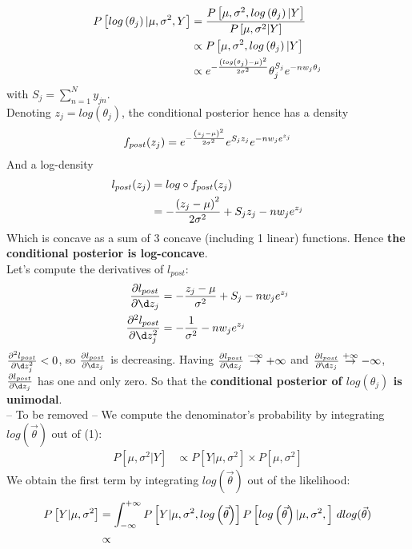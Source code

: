 \documentclass[twoside]{article}
\begin{document}
\begin{align*}
P\left[log\left(\theta_j\right) | \mu, \sigma^2, Y\right] & =  \frac{P\left[\mu, \sigma^2, log\left(\theta_j\right) | Y\right]}{P\left[\mu, \sigma^2 | Y\right]}\\
& \propto P\left[\mu, \sigma^2, log\left(\theta_j\right) | Y\right]\\
& \propto  \* e^{- \frac{\left(log\left(\theta_j\right) - \mu\right)^2}{2 \* \sigma^2}} \* \theta_j^{S_j} \* e^{- n \* w_j \* \theta_j}
\end{align*}
with $S_j = \sum_{n=1}^N y_{jn}$.\\
Denoting $z_j = log(\theta_j)$, the conditional posterior hence has a density
\begin{align*}
f_{post}(z_j) = e^{- \frac{\left(z_j - \mu\right)^2}{2 \* \sigma^2}} \* e^{S_j \* z_j} \* e^{- n \* w_j \* e^{z_j}}
\end{align*}
And a log-density
\begin{align*}
l_{post}(z_j) & = log \circ f_{post}(z_j)\\
&  = - \frac{\left(z_j - \mu\right)^2}{2 \* \sigma^2} + S_j \* z_j - n \* w_j \* e^{z_j}
\end{align*}
Which is concave as a sum of 3 concave (including 1 linear) functions. Hence \textbf{the conditional posterior is log-concave}.\\

Let's compute the derivatives of $l_{post}$:
\begin{align*}
\frac{\partial l_{post}}{\partial \d z_j} & = - \frac{z_j - \mu}{\sigma^2} + S_j - n \* w_j \* e^{z_j}\\
\frac{\partial^2 l_{post}}{\partial \d z_j^2} & = - \frac{1}{\sigma^2} - n \* w_j \* e^{z_j}
\end{align*}
$\frac{\partial^2 l_{post}}{\partial \d z_j^2} <0$, so $\frac{\partial l_{post}}{\partial \d z_j}$ is decreasing. Having $\frac{\partial l_{post}}{\partial \d z_j} \overset{-\infty}{\to} +\infty$ and $\frac{\partial l_{post}}{\partial \d z_j} \overset{+\infty}{\to} -\infty$, $\frac{\partial l_{post}}{\partial \d z_j}$ has one and only zero. So that the \textbf{conditional posterior of $log\left(\theta_j\right)$ is unimodal}.\\


-- To be removed --
We compute the denominator's probability by integrating $log\left(\vec{\theta}\right)$ out of (1):
\begin{align*}
P\left[\mu, \sigma^2 | Y \right] & \propto P\left[Y | \mu, \sigma^2 \right] \times P\left[\mu, \sigma^2\right]
\end{align*}
We obtain the first term by integrating $log\left(\vec{\theta}\right)$ out of the likelihood:
\begin{align*}
 P\left[Y | \mu, \sigma^2 \right] & = \int_{-\infty}^{+\infty} P\left[Y | \mu, \sigma^2, log\left(\vec{\theta}\right)\right] \* P\left[log\left(\vec{\theta}\right) | \mu, \sigma^2, \right]\,dlog(\vec{\theta})\\
 & \propto 
\end{align*}
\end{document}
